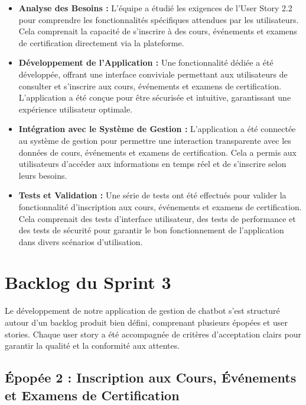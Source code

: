 \documentclass[a4paper, 11pt, openany]{report}
\begin{document}
\begin{itemize}
    \item \textbf{Analyse des Besoins :} L'équipe a étudié les exigences de l'User Story 2.2 pour comprendre les fonctionnalités spécifiques attendues par les utilisateurs. Cela comprenait la capacité de s'inscrire à des cours, événements et examens de certification directement via la plateforme.
    
    \item \textbf{Développement de l'Application :} Une fonctionnalité dédiée a été développée, offrant une interface conviviale permettant aux utilisateurs de consulter et s'inscrire aux cours, événements et examens de certification. L'application a été conçue pour être sécurisée et intuitive, garantissant une expérience utilisateur optimale.
    
    \item \textbf{Intégration avec le Système de Gestion :} L'application a été connectée au système de gestion pour permettre une interaction transparente avec les données de cours, événements et examens de certification. Cela a permis aux utilisateurs d'accéder aux informations en temps réel et de s'inscrire selon leurs besoins.
    
    \item \textbf{Tests et Validation :} Une série de tests ont été effectués pour valider la fonctionnalité d'inscription aux cours, événements et examens de certification. Cela comprenait des tests d'interface utilisateur, des tests de performance et des tests de sécurité pour garantir le bon fonctionnement de l'application dans divers scénarios d'utilisation.
\end{itemize}

\section{Backlog du Sprint 3}

Le développement de notre application de gestion de chatbot s’est structuré autour d’un backlog produit bien défini, comprenant plusieurs épopées et user stories. Chaque user story a été accompagnée de critères d’acceptation clairs pour garantir la qualité et la conformité aux attentes.

\subsection{Épopée 2 : Inscription aux Cours, Événements et Examens de Certification}
\end{document}
